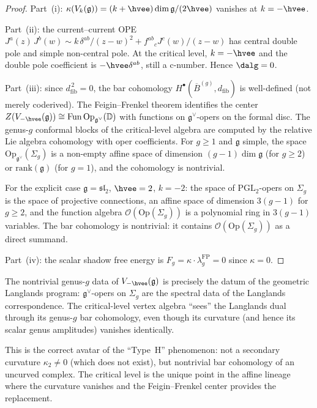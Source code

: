 \documentclass[11pt]{article}
\newcommand{\cO}{\mathcal{O}}
\newcommand{\fg}{\mathfrak{g}}
\newcommand{\fsl}{\mathfrak{sl}}
\newcommand{\barB}{\overline{B}}
\newcommand{\bD}{\mathbb{D}}
\newcommand{\dfib}{d_{\mathrm{fib}}}
\begin{document}
\begin{proof}
Part~(i): $\kappa(V_k(\fg)) = (k+\hvee)\dim\fg/(2\hvee)$
vanishes at $k = -\hvee$.

Part~(ii): the current--current OPE $J^a(z)\,J^b(w) \sim
k\,\delta^{ab}/(z-w)^2 + f^{ab}{}_c J^c(w)/(z-w)$ has
central double pole and simple non-central pole.
At the critical level, $k = -\hvee$ and the double pole
coefficient is $-\hvee \delta^{ab}$, still a c-number.
Hence $\dalg = 0$.

Part~(iii): since $\dfib^{\,2} = 0$, the bar cohomology
$H^\bullet(\barB^{(g)}, \dfib)$ is well-defined (not
merely coderived).  The Feigin--Frenkel theorem identifies
the center $Z(V_{-\hvee}(\fg)) \cong
\mathrm{Fun}\,\mathrm{Op}_{\fg^\vee}(\bD)$ with functions
on $\fg^\vee$-opers on the formal disc.  The genus-$g$
conformal blocks of the critical-level algebra are computed
by the relative Lie algebra cohomology with oper
coefficients.  For $g \geq 1$ and $\fg$ simple, the space
$\mathrm{Op}_{\fg^\vee}(\Sigma_g)$ is a non-empty affine
space of dimension $(g-1)\dim\fg$ (for $g \geq 2$) or
$\mathrm{rank}(\fg)$ (for $g = 1$), and the cohomology
is nontrivial.

For the explicit case $\fg = \fsl_2$, $\hvee = 2$,
$k = -2$: the space of $\mathrm{PGL}_2$-opers on
$\Sigma_g$ is the space of projective connections, an
affine space of dimension $3(g-1)$ for $g \geq 2$,
and the function algebra $\cO(\mathrm{Op}(\Sigma_g))$
is a polynomial ring in $3(g-1)$ variables.
The bar cohomology is nontrivial: it contains
$\cO(\mathrm{Op}(\Sigma_g))$ as a direct summand.

Part~(iv): the scalar shadow free energy is
$F_g = \kappa \cdot \lambda_g^{\mathrm{FP}} = 0$
since $\kappa = 0$.
\end{proof}

\begin{remark}
\label{rem:critical-langlands}
The nontrivial genus-$g$ data of $V_{-\hvee}(\fg)$ is
precisely the datum of the geometric Langlands program:
$\fg^\vee$-opers on $\Sigma_g$ are the spectral data of
the Langlands correspondence.  The critical-level vertex
algebra ``sees'' the Langlands dual through its genus-$g$
bar cohomology, even though its curvature (and hence its
scalar genus amplitudes) vanishes identically.

This is the correct avatar of the ``Type~H'' phenomenon:
not a secondary curvature $\kappa_2 \neq 0$
(which does not exist), but nontrivial bar cohomology
of an uncurved complex.  The critical level is the unique
point in the affine lineage where the curvature vanishes
and the Feigin--Frenkel center provides the replacement.
\end{remark}
\end{document}
